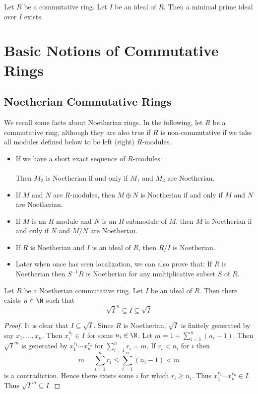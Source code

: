 \documentclass[a4paper]{article}
\begin{document}
\begin{prp}{}{} Let $R$ be a commutative ring. Let $I$ be an ideal of $R$. Then a minimal prime ideal over $I$ exists. 
\end{prp}

\pagebreak
\section{Basic Notions of Commutative Rings}
\subsection{Noetherian Commutative Rings}
We recall some facts about Noetherian rings. In the following, let $R$ be a commutative ring, although they are also true if $R$ is non-commutative if we take all modules defined below to be left (right) $R$-modules. 

\begin{itemize}
\item If we have a short exact sequence of $R$-modules: \\
\\
Then $M_2$ is Noetherian if and only if $M_1$ and $M_3$ are Noetherian. 
\item If $M$ and $N$ are $R$-modules, then $M\oplus N$ is Noetherian if and only if $M$ and $N$ are Noetherian. 
\item If $M$ is an $R$-module and $N$ is an $R$-submodule of $M$, then $M$ is Noetherian if and only if $N$ and $M/N$ are Noetherian.
\item If $R$ is Noetherian and $I$ is an ideal of $R$, then $R/I$ is Noetherian. 
\item Later when once has seen localization, we can also prove that: If $R$ is Noetherian then $S^{-1}R$ is Noetherian for any multiplicative subset $S$ of $R$. 
\end{itemize}

\begin{prp}{}{} Let $R$ be a Noetherian commutative ring. Let $I$ be an ideal of $R$. Then there exists $n\in\N$ such that $$\sqrt{I}^n\subseteq I\subseteq\sqrt{I}$$ 
\begin{proof}
It is clear that $I\subseteq\sqrt{I}$. Since $R$ is Noetherian, $\sqrt{I}$ is finitely generated by say $x_1,\dots,x_n$. Then $x_i^{n_i}\in I$ for some $n_i\in\N$. Let $m=1+\sum_{i=1}^n(n_i-1)$. Then $\sqrt{I}^m$ is generated by $x_1^{r_1}\cdots x_n^{r_n}$ for $\sum_{i=1}^nr_i=m$. If $r_i<n_i$ for $i$ then $$m=\sum_{i=1}^nr_i\leq\sum_{i=1}^n(n_i-1)<m$$ is a contradiction. Hence there exists some $i$ for which $r_i\geq n_i$. Thus $x_1^{r_1}\cdots x_n^{r_n}\in I$. Thus $\sqrt{I}^m\subseteq I$. 
\end{proof}
\end{prp}
\end{document}
